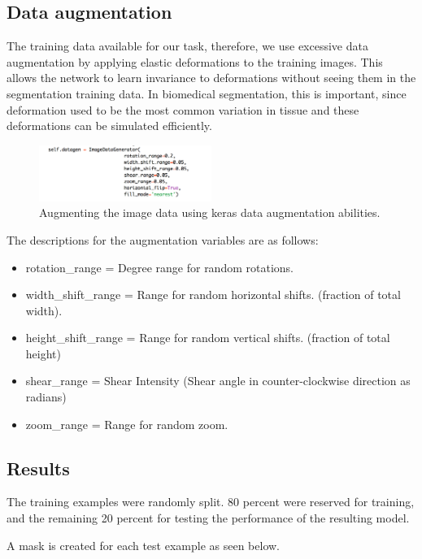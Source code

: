 \documentclass[letterpaper]{article}
\begin{document}
\subsection{Data augmentation}
The training data available for our task, therefore, we use excessive data augmentation by applying elastic deformations to the training images. This allows the network to learn invariance to deformations without seeing them in the segmentation training data. In biomedical segmentation, this is important, since deformation used to be the most common variation in tissue and these deformations can be simulated efficiently. 

 \begin{figure}[H]
  \centerline{\includegraphics[width=0.5\textwidth]{Images/KerasDataAugmentation.png}}
  \caption{Augmenting the image data using keras data augmentation abilities.}
  \label{fig:unet3}
\end{figure}

The descriptions for the augmentation variables are as follows:

\begin{itemize}
  \item rotation\_range = Degree range for random rotations.
  \item width\_shift\_range =  Range for random horizontal shifts. (fraction of total width). 
  \item height\_shift\_range = Range for random vertical shifts. (fraction of total height)
  \item shear\_range = Shear Intensity (Shear angle in counter-clockwise direction as radians)
  \item zoom\_range = Range for random zoom.
\end{itemize}



\subsection{Results}
The training examples were randomly split. 80 percent were reserved for training, and the remaining 20 percent for testing the performance of the resulting model.

A mask is created for each test example as seen below.
\end{document}
